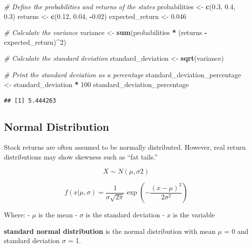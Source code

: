 \documentclass[
]{book}
\newenvironment{Shaded}{\begin{snugshade}}{\end{snugshade}}
\newcommand{\CommentTok}[1]{\textcolor[rgb]{0.56,0.35,0.01}{\textit{#1}}}
\newcommand{\DecValTok}[1]{\textcolor[rgb]{0.00,0.00,0.81}{#1}}
\newcommand{\FloatTok}[1]{\textcolor[rgb]{0.00,0.00,0.81}{#1}}
\newcommand{\FunctionTok}[1]{\textcolor[rgb]{0.13,0.29,0.53}{\textbf{#1}}}
\newcommand{\NormalTok}[1]{#1}
\newcommand{\OtherTok}[1]{\textcolor[rgb]{0.56,0.35,0.01}{#1}}
\newcommand{\SpecialCharTok}[1]{\textcolor[rgb]{0.81,0.36,0.00}{\textbf{#1}}}
\begin{document}
\begin{Shaded}
\begin{Highlighting}[]
\CommentTok{\# Define the probabilities and returns of the states}
\NormalTok{probabilities }\OtherTok{\textless{}{-}} \FunctionTok{c}\NormalTok{(}\FloatTok{0.3}\NormalTok{, }\FloatTok{0.4}\NormalTok{, }\FloatTok{0.3}\NormalTok{)}
\NormalTok{returns }\OtherTok{\textless{}{-}} \FunctionTok{c}\NormalTok{(}\FloatTok{0.12}\NormalTok{, }\FloatTok{0.04}\NormalTok{, }\SpecialCharTok{{-}}\FloatTok{0.02}\NormalTok{)}
\NormalTok{expected\_return }\OtherTok{\textless{}{-}} \FloatTok{0.046}

\CommentTok{\# Calculate the variance}
\NormalTok{variance }\OtherTok{\textless{}{-}} \FunctionTok{sum}\NormalTok{(probabilities }\SpecialCharTok{*}\NormalTok{ (returns }\SpecialCharTok{{-}}\NormalTok{ expected\_return)}\SpecialCharTok{\^{}}\DecValTok{2}\NormalTok{)}

\CommentTok{\# Calculate the standard deviation}
\NormalTok{standard\_deviation }\OtherTok{\textless{}{-}} \FunctionTok{sqrt}\NormalTok{(variance)}

\CommentTok{\# Print the standard deviation as a percentage}
\NormalTok{standard\_deviation\_percentage }\OtherTok{\textless{}{-}}\NormalTok{ standard\_deviation }\SpecialCharTok{*} \DecValTok{100}
\NormalTok{standard\_deviation\_percentage}
\end{Highlighting}
\end{Shaded}

\begin{verbatim}
## [1] 5.444263
\end{verbatim}

\hypertarget{normal-distribution}{%
\subsection{Normal Distribution}\label{normal-distribution}}

Stock returns are often assumed to be normally distributed. However, real return distributions may show skewness such as ``fat tails.''

\[X∼N(μ,σ2)\]

\[
f(x | \mu, \sigma) = \frac{1}{\sigma \sqrt{2\pi}} \exp\left(-\frac{(x - \mu)^2}{2\sigma^2}\right)
\]

Where:
- \(\mu\) is the mean
- \(\sigma\) is the standard deviation
- \(x\) is the variable

\textbf{standard normal distribution} is the normal distribution with mean \(μ\) = 0 and standard deviation \(σ\) = 1.
\end{document}
